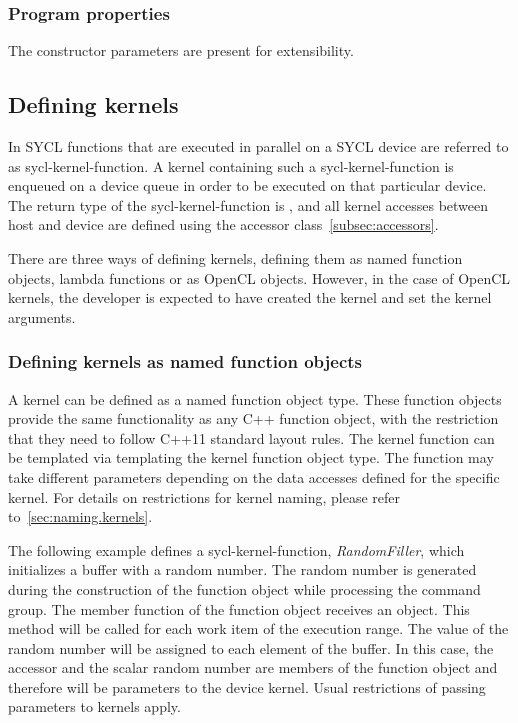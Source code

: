 \subsubsection{Program properties}
\label{sec:interfaces.program.properties}

The  constructor parameters are present for extensibility.

\subsection{Defining kernels}
In SYCL functions that are executed in parallel on a SYCL device are referred to
as \gls{sycl-kernel-function}. A \gls{kernel} containing such a
\gls{sycl-kernel-function} is enqueued on a device queue in order to
be executed on
that particular device. The return type of the \gls{sycl-kernel-function} is
, and all kernel accesses between host and device are defined using the
accessor class~\ref{subsec:accessors}.

There are three ways of defining kernels, defining them as named function objects,
lambda functions or as OpenCL  objects. However, in the case of
OpenCL kernels, the developer is expected to have created the kernel and set the
kernel arguments.

\subsubsection{Defining kernels as named function objects}
\label{sec:interfaces.kernels.as.function-objects}

A kernel can be defined as a named function object type. These function objects
provide the same functionality as any C++ function object, with the
restriction that they need to follow C++11 standard layout rules.
The kernel function can be templated via templating the kernel
function object type. The  function may take different
parameters depending on the data accesses defined for the
specific kernel. For details on restrictions for kernel naming,
please refer to~\ref{sec:naming.kernels}.

The following example defines a \gls{sycl-kernel-function}, \textit{RandomFiller},
which initializes a buffer with a random number. 
The random number is generated during the construction of the function 
object while processing the command group.
The  member function of the function object receives an  object.
This method will be called for each work item of the execution range.
The value of the random number will be assigned to each element of the
buffer.
In this case, the accessor and the scalar random number are members of the
function object and therefore will be parameters to the device kernel.
Usual restrictions of passing parameters to kernels apply.


